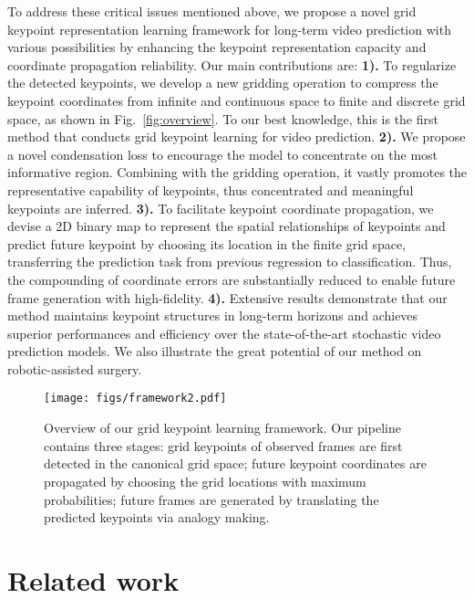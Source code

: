 \documentclass[letterpaper, 10 pt, conference]{ieeeconf}
\begin{document}
To address these critical issues mentioned above, we propose a novel grid keypoint representation learning framework for long-term video prediction with various possibilities by enhancing the keypoint representation capacity and coordinate propagation reliability. 
Our main contributions are: 
\textbf{1).} 
To regularize the detected keypoints, we develop a new gridding operation to compress the keypoint coordinates from infinite and continuous space to finite and discrete grid space, as shown in Fig.~\ref{fig:overview}. 
To our best knowledge, this is the first method that conducts grid keypoint learning for video prediction. 
\textbf{2).} We propose a novel condensation loss to encourage the model to concentrate on the most informative region. 
Combining with the gridding operation, it vastly promotes the representative capability of keypoints, thus concentrated and meaningful keypoints are inferred. 
\textbf{3).} To facilitate keypoint coordinate propagation, we devise a 2D binary map to represent the spatial relationships of keypoints and predict future keypoint by choosing its location in the finite grid space, transferring the prediction task from previous regression to classification.
Thus, the compounding of coordinate errors are substantially reduced to enable future frame generation with high-fidelity. 
\textbf{4).} Extensive results demonstrate that our method maintains keypoint structures in long-term horizons and achieves superior performances and efficiency over the state-of-the-art stochastic video prediction models. 
We also illustrate the great potential of our method on robotic-assisted surgery.  







\begin{figure*}[t]
	\texttt{[image: figs/framework2.pdf]}
	\centering
	\caption{Overview of our grid keypoint learning framework. 
	Our pipeline contains three stages: grid keypoints of observed frames are first detected in the canonical grid space;
	future keypoint coordinates are propagated by choosing the grid locations with maximum probabilities;
	future frames are generated by translating the predicted keypoints via analogy making.
	}
	\label{fig:framework}
	\vspace{-5mm}
\end{figure*}



\section{Related work}
\end{document}
